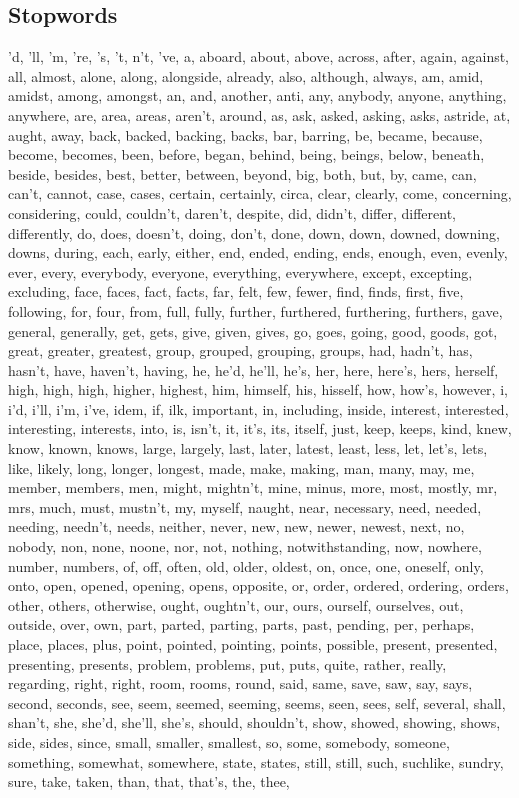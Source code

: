 \documentclass[a4paper]{article}
\begin{document}
\subsection{Stopwords}
'd, 'll, 'm, 're, 's, 't, n't, 've, a, aboard, about, above, across, after, again, against, all, almost, alone, along, alongside, already, also, although, always, am, amid, amidst, among, amongst, an, and, another, anti, any, anybody, anyone, anything, anywhere, are, area, areas, aren't, around, as, ask, asked, asking, asks, astride, at, aught, away, back, backed, backing, backs, bar, barring, be, became, because, become, becomes, been, before, began, behind, being, beings, below, beneath, beside, besides, best, better, between, beyond, big, both, but, by, came, can, can't, cannot, case, cases, certain, certainly, circa, clear, clearly, come, concerning, considering, could, couldn't, daren't, despite, did, didn't, differ, different, differently, do, does, doesn't, doing, don't, done, down, down, downed, downing, downs, during, each, early, either, end, ended, ending, ends, enough, even, evenly, ever, every, everybody, everyone, everything, everywhere, except, excepting, excluding, face, faces, fact, facts, far, felt, few, fewer, find, finds, first, five, following, for, four, from, full, fully, further, furthered, furthering, furthers, gave, general, generally, get, gets, give, given, gives, go, goes, going, good, goods, got, great, greater, greatest, group, grouped, grouping, groups, had, hadn't, has, hasn't, have, haven't, having, he, he'd, he'll, he's, her, here, here's, hers, herself, high, high, high, higher, highest, him, himself, his, hisself, how, how's, however, i, i'd, i'll, i'm, i've, idem, if, ilk, important, in, including, inside, interest, interested, interesting, interests, into, is, isn't, it, it's, its, itself, just, keep, keeps, kind, knew, know, known, knows, large, largely, last, later, latest, least, less, let, let's, lets, like, likely, long, longer, longest, made, make, making, man, many, may, me, member, members, men, might, mightn't, mine, minus, more, most, mostly, mr, mrs, much, must, mustn't, my, myself, naught, near, necessary, need, needed, needing, needn't, needs, neither, never, new, new, newer, newest, next, no, nobody, non, none, noone, nor, not, nothing, notwithstanding, now, nowhere, number, numbers, of, off, often, old, older, oldest, on, once, one, oneself, only, onto, open, opened, opening, opens, opposite, or, order, ordered, ordering, orders, other, others, otherwise, ought, oughtn't, our, ours, ourself, ourselves, out, outside, over, own, part, parted, parting, parts, past, pending, per, perhaps, place, places, plus, point, pointed, pointing, points, possible, present, presented, presenting, presents, problem, problems, put, puts, quite, rather, really, regarding, right, right, room, rooms, round, said, same, save, saw, say, says, second, seconds, see, seem, seemed, seeming, seems, seen, sees, self, several, shall, shan't, she, she'd, she'll, she's, should, shouldn't, show, showed, showing, shows, side, sides, since, small, smaller, smallest, so, some, somebody, someone, something, somewhat, somewhere, state, states, still, still, such, suchlike, sundry, sure, take, taken, than, that, that's, the, thee, 
\end{document}
